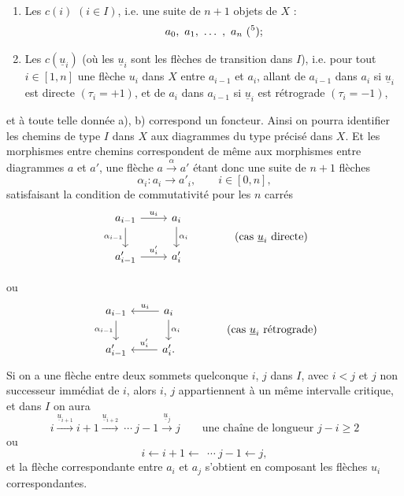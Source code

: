 \documentclass[11pt]{article}
\newcommand{\printedpage}[1]{\if\relax\detokenize{#1}\relax\else\marginpar{\raggedright\footnotesize p.~#1}\fi}
\newcommand{\msp}[1]{\marginpar{\raggedright\footnotesize [#1]}}
\begin{document}
\begin{enumerate}
\item[a)] Les $c(i)$ $(i \in I)$, i.e. une suite de $n+1$ objets de $X$ :
\[
a_0,\ a_1,\ \dots\ ,\ a_n\ (\text{\footnotemark[5]});
\]

\item[b)] Les $c(\underline{u}_i)$ (où les $\underline{u}_i$ sont les flèches de transition dans $I$), i.e. pour tout $i \in [1,n]$ une flèche $u_i$ dans $X$ entre $a_{i-1}$ et $a_i$, allant de $a_{i-1}$ dans $a_i$ si $\underline{u}_i$ est directe $(\tau_i = +1)$, et de $a_i$ dans $a_{i-1}$ si $\underline{u}_i$ est rétrograde $(\tau_i = -1)$,
\end{enumerate}

et à toute telle donnée a), b) correspond un foncteur. Ainsi on pourra identifier les chemins de type $I$ \msp{page 14} dans $X$ aux diagrammes du type précisé dans $X$. Et les morphismes entre chemins correspondent de même aux morphismes entre diagrammes $a$ et $a'$, une flèche $a \xrightarrow{\alpha} a'$ étant donc une suite de $n+1$ flèches
\[
\alpha_i : a_i \longrightarrow a'_i, \qquad i \in [0,n],
\]
satisfaisant la condition de commutativité pour les $n$ carrés
\[
\begin{tikzcd}
a_{i-1} \arrow[r, "u_i"] \arrow[d, "\alpha_{i-1}"'] & a_i \arrow[d, "\alpha_i"] \\
a'_{i-1} \arrow[r, "u'_i"] & a'_i
\end{tikzcd}
\qquad\qquad \text{(cas $\underline{u}_i$ directe)}
\]

\printedpage{10}
ou
\[
\begin{tikzcd}
a_{i-1} \arrow[d, "\alpha_{i-1}"'] & a_i \arrow[l, "u_i"'] \arrow[d, "\alpha_i"] \\
a'_{i-1} & a'_i. \arrow[l, "u'_i"']
\end{tikzcd}
\qquad\qquad \text{(cas $\underline{u}_i$ rétrograde)}
\]
Si on a une flèche entre deux sommets quelconque $i$, $j$ dans $I$, avec $i < j$ et $j$ non successeur immédiat de $i$, alors $i$, $j$ appartiennent à un même intervalle critique, et dans $I$ on aura %
\[
i \xrightarrow{\underline{u}_{i+1}} i+1 \xrightarrow{\underline{u}_{i+2}}\ \cdots\ j-1 \xrightarrow{\underline{u}_j} j \qquad \text{une chaîne de longueur } j-i \geq 2 %
\]
ou
\[
i \longleftarrow i+1 \longleftarrow\ \ \cdots\ j-1 \longleftarrow j,
\]
et la flèche correspondante entre $a_i$ et $a_j$ s'obtient en composant les flèches $u_i$ correspondantes.
\end{document}
